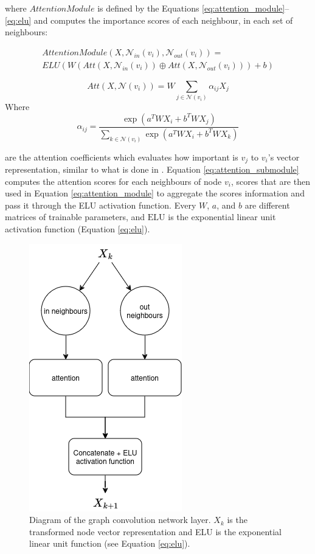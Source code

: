 where $AttentionModule$ is defined by the Equations \ref{eq:attention_module}--\ref{eq:elu}
and computes the importance scores of each neighbour, in each set of neighbours:

\begin{multline}
    AttentionModule(X, \mathcal{N}_{in}(v_i), \mathcal{N}_{out}(v_i)) = \\
    ELU\left( W \left( Att(X, \mathcal{N}_{in}(v_i)) \oplus Att(X, \mathcal{N}_{out}(v_i)) \right) + b \right)
    \label{eq:attention_module}
\end{multline}

\begin{equation}
Att(X, \mathcal{N}(v_i)) = W\sum_{j \in \mathcal{N}(v_i)} \alpha_{ij} X_j
\label{eq:attention_submodule}
\end{equation}
Where 
\begin{equation}
    \alpha_{ij} = \frac{\exp \left ({ a ^{T} W X_{i} + b ^{T} W X_{j} }\right )}
    {{\sum _{k \in \mathcal {N}(v_{i})}} \exp \left ({ a ^{T} W X_{i} + b ^{T} W X_{k} }\right )}
\end{equation}

are the attention coefficients
which evaluates how important is $v_j$ to $v_i$'s vector 
representation, similar to what is done in \citet{Lee2021GlobalDagSchedDRL}.
Equation \ref{eq:attention_submodule} computes the attention scores
for each neighbours of node $v_i$, 
scores that are then used in Equation \ref{eq:attention_module}
to aggregate the scores information and pass it through 
the ELU activation function.
Every $W$, $a$, and $b$ are different matrices of trainable parameters,
and $\text{ELU}$ is the exponential linear unit activation function (Equation \ref{eq:elu}).

\begin{figure}
    \centering
    \includegraphics[width=0.5\linewidth]{images/gcn_update_aggregate_diagram.png}
    \caption{Diagram of the graph convolution network layer. $X_k$ is the transformed node vector representation
    and ELU is the exponential linear unit function (see Equation \ref{eq:elu}).}
    \label{fig:update_aggregate_diagram}
\end{figure}

